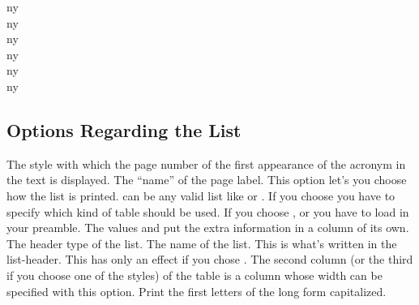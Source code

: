 \documentclass[DIV10,toc=index,toc=bib,hyperfootnotes=false]{cnpkgdoc}
\begin{document}
\begin{beispiel}
 \acf{ny} \\
 \acf{ny} \\
 \acf{ny} \\
 \acf{ny} \\
 \acf{ny} \\
 \acf{ny}
\end{beispiel}

\subsection{Options Regarding the List}
\begin{beschreibung}
   The style with which the page number of the first appearance of the acronym
   in the text is displayed.
   The ``name'' of the page label.
   This option let's you choose how the list is printed.  can be any
   valid list like
  or .
   If you choose  you have to specify which kind of table
   should be used. If you choose ,  or
    you have to load  in your preamble.
   The values  and  put the extra
   information in a column of its own.
 \\
   The header type of the list.
   The name of the list. This is what's written in the list-header.
   This has only an effect if you chose . The second column
   (or the third if you choose one of the  styles) of the table is a
    column whose width can be specified with this option.
   Print the first letters of the long form capitalized.
\end{beschreibung}
\end{document}
